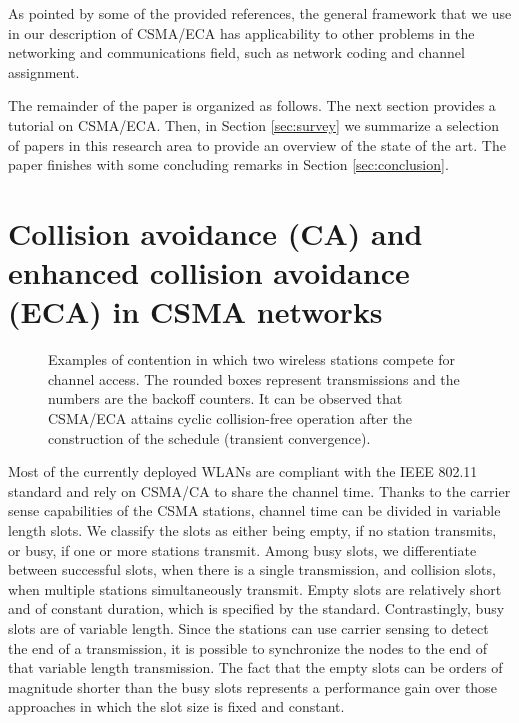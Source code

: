 \documentclass[journal]{IEEEtran}
\begin{document}
As pointed by some of the provided references, the general framework that we use in our description of CSMA/ECA has applicability to other problems in the networking and communications field, such as network coding and channel assignment.

The remainder of the paper is organized as follows.
The next section provides a tutorial on CSMA/ECA.
Then, in Section \ref{sec:survey} we summarize a selection of papers in this research area to provide an overview of the state of the art. 
The paper finishes with some concluding remarks in Section \ref{sec:conclusion}.

\section{Collision avoidance (CA) and enhanced collision avoidance (ECA) in CSMA networks}
\label{sec:eca}

\begin{figure}[!t]
\centering
{}
\caption{Examples of contention in which two wireless stations compete for channel access. The rounded boxes represent transmissions and the numbers are the backoff counters. It can be observed that CSMA/ECA attains cyclic collision-free operation after the construction of the schedule (transient convergence).}
\label{fig:ca_vs_eca}
\end{figure}

Most of the currently deployed WLANs are compliant with the IEEE 802.11 standard and rely on CSMA/CA to share the channel time.
Thanks to the carrier sense capabilities of the CSMA stations, channel time can be divided in variable length slots.
We classify the slots as either being empty, if no station transmits, or busy, if one or more stations transmit.
Among busy slots, we differentiate between successful slots, when there is a single transmission, and collision slots, when multiple stations simultaneously transmit.
Empty slots are relatively short and of constant duration, which is specified by the standard.
Contrastingly, busy slots are of variable length. 
Since the stations can use carrier sensing to detect the end of a transmission, it is possible to synchronize the nodes to the end of that variable length transmission.
The fact that the empty slots can be orders of magnitude shorter than the busy slots represents a performance gain over those approaches in which the slot size is fixed and constant.
\end{document}
